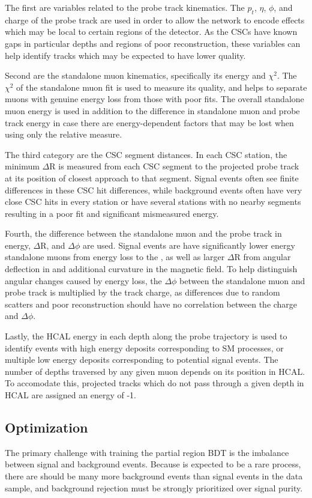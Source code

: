 The first are variables related to the probe track kinematics. 
The $p_t$, $\eta$, $\phi$, and charge of the probe track are used in order to allow the network to encode effects which may be local to certain regions of the detector.
As the CSCs have known gaps in particular depths and regions of poor reconstruction, these variables can help identify tracks which may be expected to have lower quality.

Second are the standalone muon kinematics, specifically its energy and $\chi^{2}$.
The $\chi^{2}$ of the standalone muon fit is used to measure its quality, and helps to separate muons with genuine energy loss from those with poor fits.
The overall standalone muon energy is used in addition to the difference in standalone muon and probe track energy in case there are energy-dependent factors that may be lost when using only the relative measure.

The third category are the CSC segment distances.
In each CSC station, the minimum $\Delta$R is measured from each CSC segment to the projected probe track at its position of closest approach to that segment.
Signal events often see finite differences in these CSC hit differences, while background events often have very close CSC hits in every station or have several stations with no nearby segments resulting in a poor fit and significant mismeasured energy.

Fourth, the difference between the standalone muon and the probe track in energy, $\Delta$R, and $\Delta \phi$ are used.
Signal events are have significantly lower energy standalone muons from energy loss to the \aprime, as well as larger $\Delta$R from angular deflection in \dbrem and additional curvature in the magnetic field.
To help distinguish angular changes caused by energy loss, the $\Delta \phi$ between the standalone muon and probe track is multiplied by the track charge, as differences due to random scatters and poor reconstruction should have no correlation between the charge and $\Delta \phi$.

Lastly, the HCAL energy in each depth along the probe trajectory is used to identify events with high energy deposits corresponding to SM processes, or multiple low energy deposits corresponding to potential signal events.
The number of depths traversed by any given muon depends on its position in HCAL.
To accomodate this, projected tracks which do not pass through a given depth in HCAL are assigned an energy of -1. 

\subsection{Optimization}
The primary challenge with training the partial region BDT is the imbalance between signal and background events. 
Because \dbrem is expected to be a rare process, there are should be many more background events than signal events in the data sample, and background rejection must be strongly prioritized over signal purity.


